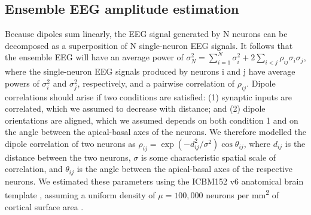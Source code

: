 \subsection{Ensemble EEG amplitude estimation}
Because dipoles sum linearly, the EEG signal generated by N neurons can be decomposed as a superposition of N single-neuron EEG signals. It follows that the ensemble EEG will have an average power of $\sigma_N^2=\sum_{i=1}^{N}\sigma_i^2+2\sum_{i<j}{\rho_{ij}\sigma_i\sigma_j}$, where the single-neuron EEG signals produced by neurons i and j have average powers of $\sigma_i^2$ and $\sigma_j^2$, respectively, and a pairwise correlation of $\rho_{ij}$. Dipole correlations should arise if two conditions are satisfied: (1) synaptic inputs are correlated, which we assumed to decrease with distance; and (2) dipole orientations are aligned, which we assumed depends on both condition 1 and on the angle between the apical-basal axes of the neurons. We therefore modelled the dipole correlation of two neurons as $\rho_{ij}=\exp{\left(-d_{ij}^2/\sigma^2\right)}\cos{\theta_{ij}}$, where $d_{ij}$ is the distance between the two neurons, $\sigma$ is some characteristic spatial scale of correlation, and $\theta_{ij}$ is the angle between the apical-basal axes of the respective neurons. We estimated these parameters using the ICBM152 v6 anatomical brain template \cite{Huang2016,Fonov2009,Fonov2011}, assuming a uniform density of $\mu = 100,000$ neurons per \unit{\milli\meter\squared} of cortical surface area \cite{Carlo2013}.

